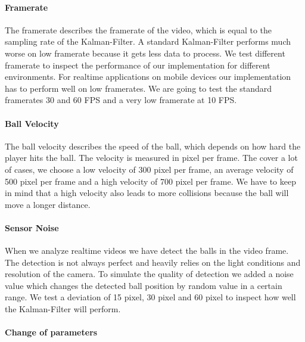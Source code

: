 \documentclass[titlepage, a4paper, 11pt]{scrartcl}
\begin{document}
            \paragraph{Framerate}

            The framerate describes the framerate of the video, which is equal to the sampling rate of the Kalman-Filter.
            A standard Kalman-Filter performs much worse on low framerate because it gets less data to process.
            We test different framerate to inspect the performance of our implementation for different environments.
            For realtime applications on mobile devices our implementation has to perform well on low framerates.
            We are going to test the standard framerates 30 and 60 FPS and a very low framerate at 10 FPS.

            \paragraph{Ball Velocity}

            The ball velocity describes the speed of the ball, which depends on how hard the player hits the ball.
            The velocity is measured in pixel per frame.
            The cover a lot of cases, we choose a low velocity of 300 pixel per frame, an average velocity of 500 pixel per frame and a high velocity of 700 pixel per frame.
            We have to keep in mind that a high velocity also leads to more collisions because the ball will move a longer distance.

            \paragraph{Sensor Noise}

            When we analyze realtime videos we have detect the balls in the video frame.
            The detection is not always perfect and heavily relies on the light conditions and resolution of the camera.
            To simulate the quality of detection we added a noise value which changes the detected ball position by random value in a certain range.
            We test a deviation of 15 pixel, 30 pixel and 60 pixel to inspect how well the Kalman-Filter will perform.

            \paragraph{Change of parameters}
\end{document}
